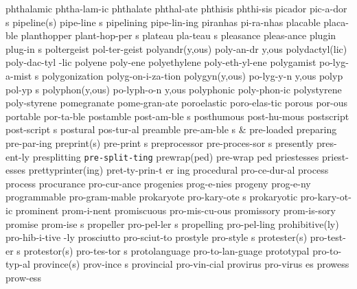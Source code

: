 \1 phthalamic		phtha-lam-ic		%
\1 phthalate		phthal-ate		%
\1 phthisis		phthi-sis		%
\5 picador		pic-a-dor s
\2 pipeline(s)		pipe-line s	%
\1 pipelining		pipe-lin-ing		%
\1 piranhas		pi-ra-nhas
\1 placable		placa-ble
\5 planthopper		plant-hop-per s	%
\NewWordtrue
\5 plateau		pla-teau s		%
\1 pleasance		pleas-ance
\5 plugin		plug-in s	%
\1 poltergeist		pol-ter-geist
\2 polyandr(y,ous)	poly-an-dr y,ous	%
\2 polydactyl(lic)	poly-dac-tyl -lic	%
\1 polyene		poly-ene
\1 polyethylene		poly-eth-yl-ene
\5 polygamist		po-lyg-a-mist s
\1 polygonization	polyg-on-i-za-tion
\2 polygyn(y,ous)	po-lyg-y-n y,ous	%
\5 polyp		pol-yp s
\2 polyphon(y,ous)	po-lyph-o-n y,ous
\1 polyphonic		poly-phon-ic		%
\1 polystyrene		poly-styrene
\1 pomegranate		pome-gran-ate
\1 poroelastic		poro-elas-tic
\1 porous		por-ous
\1 portable		por-ta-ble		%
\5 postamble		post-am-ble s
\1 posthumous		post-hu-mous	%
\5 postscript		post-script s
\1 postural		pos-tur-al
\5 preamble		pre-am-ble s
 & pre-loaded \cr
\1 preparing		pre-par-ing
\2 preprint(s)		pre-print s
\5 preprocessor		pre-proces-sor s
\1 presently		pres-ent-ly		%
\1 presplitting 	{\tt\bs pre-split-ting}
\2 prewrap(ped)		pre-wrap ped		%
\1 priestesses		priest-esses
\3 prettyprinter(ing)	pret-ty-prin-t er ing
\1 procedural		pro-ce-dur-al
\1 process		process\thinspace*
\1 procurance		pro-cur-ance
\1 progenies		prog-e-nies
\1 progeny		prog-e-ny
\1 programmable		pro-gram-mable		%
\5 prokaryote		pro-kary-ote s 		%
\1 prokaryotic		pro-kary-ot-ic		%
\1 prominent		prom-i-nent		%
\1 promiscuous		pro-mis-cu-ous		%
\1 promissory		prom-is-sory		%
\5 promise		prom-ise s		%
\5 propeller		pro-pel-ler s		%
\1 propelling		pro-pel-ling		%
\2 prohibitive(ly)	pro-hib-i-tive -ly
\1 prosciutto		pro-sciut-to
\5 prostyle		pro-style s		%
\2 protester(s)		pro-test-er s
\2 protestor(s)		pro-tes-tor s
\1 protolanguage	pro-to-lan-guage     %
\1 prototypal		pro-to-typ-al
\2 province(s)		prov-ince s		%
\1 provincial		pro-vin-cial		%
\5 provirus		pro-virus es		%
\1 prowess		prow-ess		%

